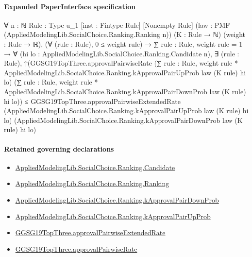 \documentclass[10pt]{article}
\begin{document}
\paragraph{Expanded PaperInterface specification}
\begin{ReviewVerbatim}
∀ {n : ℕ} {Rule : Type u_1} [inst : Fintype Rule] [Nonempty Rule]
  (law : PMF (AppliedModelingLib.SocialChoice.Ranking.Ranking n)) (K : Rule → ℕ) (weight : Rule → ℝ),
  (∀ (rule : Rule), 0 ≤ weight rule) →
    ∑ rule : Rule, weight rule = 1 →
      ∀ (hi lo : AppliedModelingLib.SocialChoice.Ranking.Candidate n),
        ∃ (rule : Rule),
          ↑(GGSG19TopThree.approvalPairwiseRate
                (∑ rule : Rule,
                  weight rule * AppliedModelingLib.SocialChoice.Ranking.kApprovalPairUpProb law (K rule) hi lo)
                (∑ rule : Rule,
                  weight rule * AppliedModelingLib.SocialChoice.Ranking.kApprovalPairDownProb law (K rule) hi lo)) ≤
            GGSG19TopThree.approvalPairwiseExtendedRate
              (AppliedModelingLib.SocialChoice.Ranking.kApprovalPairUpProb law (K rule) hi lo)
              (AppliedModelingLib.SocialChoice.Ranking.kApprovalPairDownProb law (K rule) hi lo)
\end{ReviewVerbatim}

\paragraph{Retained governing declarations}
\begin{itemize}\raggedright
\item \hyperlink{governing-declaration-8c0e6c25845ae78a}{Applied\allowbreak{}Modeling\allowbreak{}Lib.\allowbreak{}Social\allowbreak{}Choice.\allowbreak{}Ranking.\allowbreak{}Candidate}
\item \hyperlink{governing-declaration-5cde54446d1ae021}{Applied\allowbreak{}Modeling\allowbreak{}Lib.\allowbreak{}Social\allowbreak{}Choice.\allowbreak{}Ranking.\allowbreak{}Ranking}
\item \hyperlink{governing-declaration-f0edd92cba673ac3}{Applied\allowbreak{}Modeling\allowbreak{}Lib.\allowbreak{}Social\allowbreak{}Choice.\allowbreak{}Ranking.\allowbreak{}k\allowbreak{}Approval\allowbreak{}Pair\allowbreak{}Down\allowbreak{}Prob}
\item \hyperlink{governing-declaration-f7096a9aee68cc18}{Applied\allowbreak{}Modeling\allowbreak{}Lib.\allowbreak{}Social\allowbreak{}Choice.\allowbreak{}Ranking.\allowbreak{}k\allowbreak{}Approval\allowbreak{}Pair\allowbreak{}Up\allowbreak{}Prob}
\item \hyperlink{governing-declaration-04f09ccf02c40f91}{GGSG19\allowbreak{}Top\allowbreak{}Three.\allowbreak{}approval\allowbreak{}Pairwise\allowbreak{}Extended\allowbreak{}Rate}
\item \hyperlink{governing-declaration-518195fba9044936}{GGSG19\allowbreak{}Top\allowbreak{}Three.\allowbreak{}approval\allowbreak{}Pairwise\allowbreak{}Rate}
\end{itemize}
\end{document}
